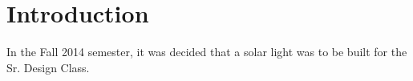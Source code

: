 \hypertarget{index_intro_sect}{}\section{Introduction}\label{index_intro_sect}
In the Fall 2014 semester, it was decided that a solar light was to be built for the Sr. Design Class. 